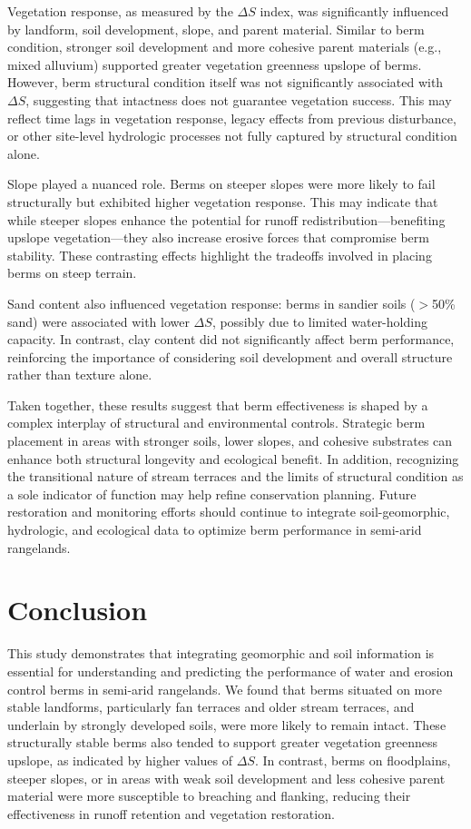 \documentclass[review]{elsarticle}
\begin{document}
Vegetation response, as measured by the $\Delta S$ index, was significantly influenced by landform, soil development, slope, and parent material. Similar to berm condition, stronger soil development and more cohesive parent materials (e.g., mixed alluvium) supported greater vegetation greenness upslope of berms. However, berm structural condition itself was not significantly associated with $\Delta S$, suggesting that intactness does not guarantee vegetation success. This may reflect time lags in vegetation response, legacy effects from previous disturbance, or other site-level hydrologic processes not fully captured by structural condition alone.

Slope played a nuanced role. Berms on steeper slopes were more likely to fail structurally but exhibited higher vegetation response. This may indicate that while steeper slopes enhance the potential for runoff redistribution—benefiting upslope vegetation—they also increase erosive forces that compromise berm stability. These contrasting effects highlight the tradeoffs involved in placing berms on steep terrain.

Sand content also influenced vegetation response: berms in sandier soils ($>$50\% sand) were associated with lower $\Delta S$, possibly due to limited water-holding capacity. In contrast, clay content did not significantly affect berm performance, reinforcing the importance of considering soil development and overall structure rather than texture alone.

Taken together, these results suggest that berm effectiveness is shaped by a complex interplay of structural and environmental controls. Strategic berm placement in areas with stronger soils, lower slopes, and cohesive substrates can enhance both structural longevity and ecological benefit. In addition, recognizing the transitional nature of stream terraces and the limits of structural condition as a sole indicator of function may help refine conservation planning. Future restoration and monitoring efforts should continue to integrate soil-geomorphic, hydrologic, and ecological data to optimize berm performance in semi-arid rangelands.

\section{Conclusion}

This study demonstrates that integrating geomorphic and soil information is essential for understanding and predicting the performance of water and erosion control berms in semi-arid rangelands. We found that berms situated on more stable landforms, particularly fan terraces and older stream terraces, and underlain by strongly developed soils, were more likely to remain intact. These structurally stable berms also tended to support greater vegetation greenness upslope, as indicated by higher values of $\Delta S$. In contrast, berms on floodplains, steeper slopes, or in areas with weak soil development and less cohesive parent material were more susceptible to breaching and flanking, reducing their effectiveness in runoff retention and vegetation restoration.
\end{document}
